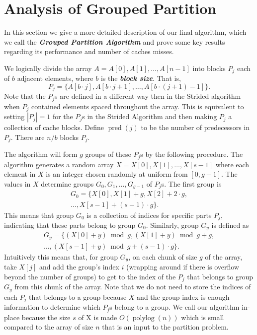 \documentclass[twocolumn, twoside, 12pt]{article}
\def\polylog{\operatorname{polylog}}
\def\pred{\operatorname{pred}}
\newcommand{\defn}[1]       {{\textit{\textbf{\boldmath #1}}}}
\renewcommand{\paragraph}[1]{\vspace{0.09in}\noindent{\bf \boldmath #1.}}
\begin{document}
\section{Analysis of Grouped Partition}
In this section we give a more detailed description of our final algorithm, which we call the \defn{Grouped Partition Algorithm} and prove some key results regarding its performance and number of caches misses. 

\paragraph{Algorithm Overview}
We logically divide the array $A = A[0],A[1],\ldots, A[n-1]$ into blocks $P_j$ each of $b$ adjacent elements, where $b$ is the \defn{block size}.
That is, 
$$P_j = \{A[b\cdot j], A[b\cdot j + 1], \ldots, A[b\cdot (j+1)-1]\}.$$
Note that the $P_j$s are defined in a different way then in the Strided algorithm when $P_j$ contained elements spaced throughout the array.
This is equivalent to setting $|P_j| = 1$ for the $P_j$s in the Strided Algorithm and then making $P_j$ a collection of cache blocks.
Define \defn{$\pred(j)$} to be the number of predecessors in $P_j$.
There are $n/b$ blocks $P_j$.

The algorithm will form $g$ groups of these $P_j$s by the following procedure. 
The algorithm generates a random array $X=X[0],X[1],\ldots,X[s-1]$ where each element in $X$ is an integer chosen randomly at uniform from $[0,g-1]$.
The values in $X$ determine groups $G_0, G_1, \ldots, G_{g-1}$ of $P_j$s.
The first group is 
\begin{multline*}
	G_0 = \{X[0], X[1]+g, X[2]+2\cdot g,\\ 
	\ldots,X[s-1]+ (s-1)\cdot g\}.
\end{multline*}
This means that group $G_0$ is a collection of indices for specific parts $P_j$, indicating that these parts belong to group $G_0$. Similarly, group $G_y$ is defined as 
\begin{multline*}
	G_y = \{(X[0]+y) \bmod g, (X[1]+y) \bmod g + g, \\
	\ldots, (X[s-1]+y) \bmod g + (s-1)\cdot g \}.
\end{multline*}
Intuitively this means that, for group $G_y$, on each chunk of size $g$ of the array, take $X[j]$ and add the group's index $i$ (wrapping around if there is overflow beyond the number of groups) to get to the index of the $P_j$ that belongs to group $G_y$ from this chunk of the array.
Note that we do not need to store the indices of each $P_j$ that belongs to a group because $X$ and the group index is enough information to determine which $P_j$s belong to a group.
We call our algorithm in-place because the size $s$ of X is made $O(\polylog(n))$ which is small compared to the array of size $n$ that is an input to the partition problem.
\end{document}
